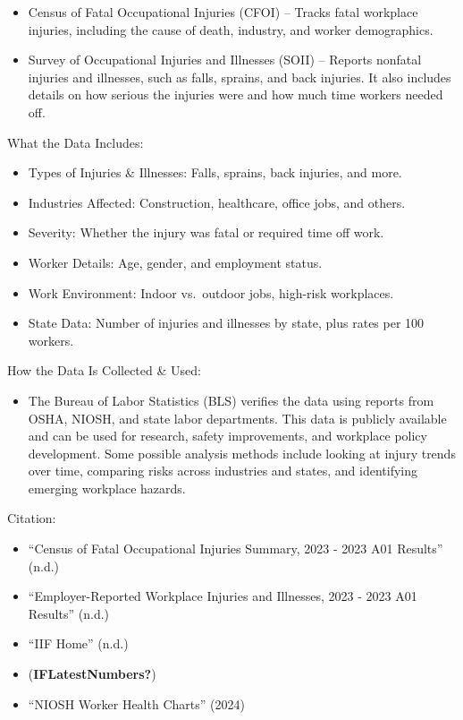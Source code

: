 \documentclass[
  letterpaper,
  DIV=11,
  numbers=noendperiod]{scrreprt}
\providecommand{\tightlist}{%
  \setlength{\itemsep}{0pt}\setlength{\parskip}{0pt}}\usepackage{longtable,booktabs,array}
\begin{document}
\begin{itemize}
\tightlist
\item
  Census of Fatal Occupational Injuries (CFOI) -- Tracks fatal workplace
  injuries, including the cause of death, industry, and worker
  demographics.
\item
  Survey of Occupational Injuries and Illnesses (SOII) -- Reports
  nonfatal injuries and illnesses, such as falls, sprains, and back
  injuries. It also includes details on how serious the injuries were
  and how much time workers needed off.
\end{itemize}

What the Data Includes:

\begin{itemize}
\tightlist
\item
  Types of Injuries \& Illnesses: Falls, sprains, back injuries, and
  more.
\item
  Industries Affected: Construction, healthcare, office jobs, and
  others.
\item
  Severity: Whether the injury was fatal or required time off work.
\item
  Worker Details: Age, gender, and employment status.
\item
  Work Environment: Indoor vs.~outdoor jobs, high-risk workplaces.
\item
  State Data: Number of injuries and illnesses by state, plus rates per
  100 workers.
\end{itemize}

How the Data Is Collected \& Used:

\begin{itemize}
\tightlist
\item
  The Bureau of Labor Statistics (BLS) verifies the data using reports
  from OSHA, NIOSH, and state labor departments. This data is publicly
  available and can be used for research, safety improvements, and
  workplace policy development. Some possible analysis methods include
  looking at injury trends over time, comparing risks across industries
  and states, and identifying emerging workplace hazards.
\end{itemize}

Citation:

\begin{itemize}
\tightlist
\item
  {``Census of {Fatal Occupational Injuries Summary}, 2023 - 2023 {A01
  Results}''} (n.d.)
\item
  {``Employer-{Reported Workplace Injuries} and {Illnesses}, 2023 - 2023
  {A01 Results}''} (n.d.)
\item
  {``{IIF Home}''} (n.d.)
\item
  (\textbf{IFLatestNumbers?})
\item
  {``{NIOSH Worker Health Charts}''} (2024)
\end{itemize}
\end{document}
